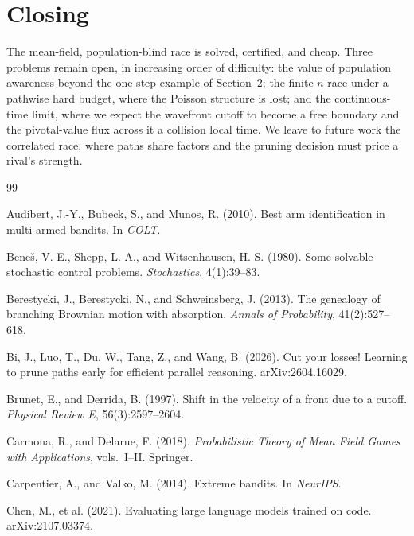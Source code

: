 \documentclass[11pt]{article}
\theoremstyle{itheads}
\begin{document}
\section{Closing}

The mean-field, population-blind race is solved, certified, and cheap.
Three problems remain open, in increasing order of difficulty: the value
of population awareness beyond the one-step example of Section~2; the
finite-$n$ race under a pathwise hard budget, where the Poisson structure
is lost; and the continuous-time limit, where we expect the wavefront
cutoff to become a free boundary and the pivotal-value flux across it a
collision local time. We leave to future work the correlated race, where
paths share factors and the pruning decision must price a rival's
strength.

\begin{thebibliography}{99}

Audibert, J.-Y., Bubeck, S., and Munos, R. (2010).
Best arm identification in multi-armed bandits.
In \emph{COLT}.

Bene\v{s}, V. E., Shepp, L. A., and Witsenhausen, H. S. (1980).
Some solvable stochastic control problems.
\emph{Stochastics}, 4(1):39--83.

Berestycki, J., Berestycki, N., and Schweinsberg, J. (2013).
The genealogy of branching Brownian motion with absorption.
\emph{Annals of Probability}, 41(2):527--618.

Bi, J., Luo, T., Du, W., Tang, Z., and Wang, B. (2026).
Cut your losses! Learning to prune paths early for efficient parallel
reasoning.
arXiv:2604.16029.

Brunet, E., and Derrida, B. (1997).
Shift in the velocity of a front due to a cutoff.
\emph{Physical Review E}, 56(3):2597--2604.

Carmona, R., and Delarue, F. (2018).
\emph{Probabilistic Theory of Mean Field Games with Applications},
vols.\ I--II. Springer.

Carpentier, A., and Valko, M. (2014).
Extreme bandits.
In \emph{NeurIPS}.

Chen, M., et al. (2021).
Evaluating large language models trained on code.
arXiv:2107.03374.


\end{thebibliography}
\end{document}
